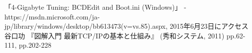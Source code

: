 \documentclass[10pt]{jsarticle}
\begin{document}
\begin{flushright}
\cite{4GT}
\cite{TCP/IP}
\end{flushright}

\newpage

\begin{thebibliography}{999}%
 「4-Gigabyte Tuning: BCDEdit and Boot.ini (Windows)」 - https://msdn.microsoft.com/ja-jp/library/windows/desktop/bb613473(v=vs.85).aspx, 2015年6月23日にアクセス
 谷口功 『図解入門 最新TCP/IPの基本と仕組み』 (秀和システム, 2011) pp.62-111, pp.202-228
\end{thebibliography}
\end{document}
